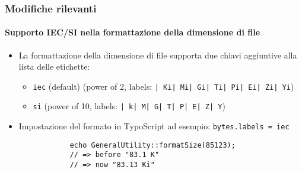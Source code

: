 \begin{frame}[fragile]
	\frametitle{Modifiche rilevanti}
	\framesubtitle{Supporto IEC/SI nella formattazione della dimensione di file}


	\begin{itemize}

		\item La formattazione della dimensione di file supporta due chiavi aggiuntive alla lista delle etichette:

			\begin{itemize}
				\item \small\texttt{iec} (default)\newline
					\small(power of 2, labels: \texttt{| Ki| Mi| Gi| Ti| Pi| Ei| Zi| Yi})\normalsize
				\item \small\texttt{si}\newline
					\small(power of 10, labels: \texttt{| k| M| G| T| P| E| Z| Y})\normalsize
			\end{itemize}

		\item Impostazione del formato in TypoScript ad esempio:\newline
			\texttt{bytes.labels = iec}

		\begin{lstlisting}
			echo GeneralUtility::formatSize(85123);
			// => before "83.1 K"
			// => now "83.13 Ki"
		\end{lstlisting}

	\end{itemize}

\end{frame}


